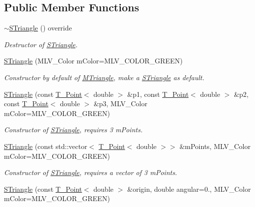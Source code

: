 \subsection*{Public Member Functions}
\begin{DoxyCompactItemize}
\item 
\mbox{\label{classSTriangle_ad278fb75870a545bcb6617058c77d73f}} 
\hyperlink{classSTriangle_ad278fb75870a545bcb6617058c77d73f}{$\sim$\+S\+Triangle} () override
\begin{DoxyCompactList}\small\item\em Destructor of \hyperlink{classSTriangle}{S\+Triangle}. \end{DoxyCompactList}\item 
\hyperlink{classSTriangle_a56ad36f53fbb46fb05d57ca6e4a41f2a}{S\+Triangle} (M\+L\+V\+\_\+\+Color mColor=M\+L\+V\+\_\+\+C\+O\+L\+O\+R\+\_\+\+G\+R\+E\+EN)
\begin{DoxyCompactList}\small\item\em Constructor by default of \hyperlink{classMTriangle}{M\+Triangle}, make a \hyperlink{classSTriangle}{S\+Triangle} as default. \end{DoxyCompactList}\item 
\hyperlink{classSTriangle_a2f80f360d80efc87dfdbbdd555d1ecfe}{S\+Triangle} (const \hyperlink{classPoint}{T_Point}$<$ double $>$ \&p1, const \hyperlink{classPoint}{T_Point}$<$ double $>$ \&p2, const \hyperlink{classPoint}{T_Point}$<$ double $>$ \&p3, M\+L\+V\+\_\+\+Color mColor=M\+L\+V\+\_\+\+C\+O\+L\+O\+R\+\_\+\+G\+R\+E\+EN)
\begin{DoxyCompactList}\small\item\em Constructor of \hyperlink{classSTriangle}{S\+Triangle}, requires 3 mPoints. \end{DoxyCompactList}\item
\hyperlink{classSTriangle_ad22ceb26e87756cdbe432e8adf743b55}{S\+Triangle} (const std\+::vector$<$ \hyperlink{classPoint}{T_Point}$<$ double $>$$>$ \&mPoints, M\+L\+V\+\_\+\+Color mColor=M\+L\+V\+\_\+\+C\+O\+L\+O\+R\+\_\+\+G\+R\+E\+EN)
\begin{DoxyCompactList}\small\item\em Constructor of \hyperlink{classSTriangle}{S\+Triangle}, requires a vector of 3 mPoints. \end{DoxyCompactList}\item
\hyperlink{classSTriangle_af5129d1631bf4d546921c7e3758fe905}{S\+Triangle} (const \hyperlink{classPoint}{T_Point}$<$ double $>$ \&origin, double angular=0., M\+L\+V\+\_\+\+Color mColor=M\+L\+V\+\_\+\+C\+O\+L\+O\+R\+\_\+\+G\+R\+E\+EN)
$$
\end{DoxyCompactItemize}
